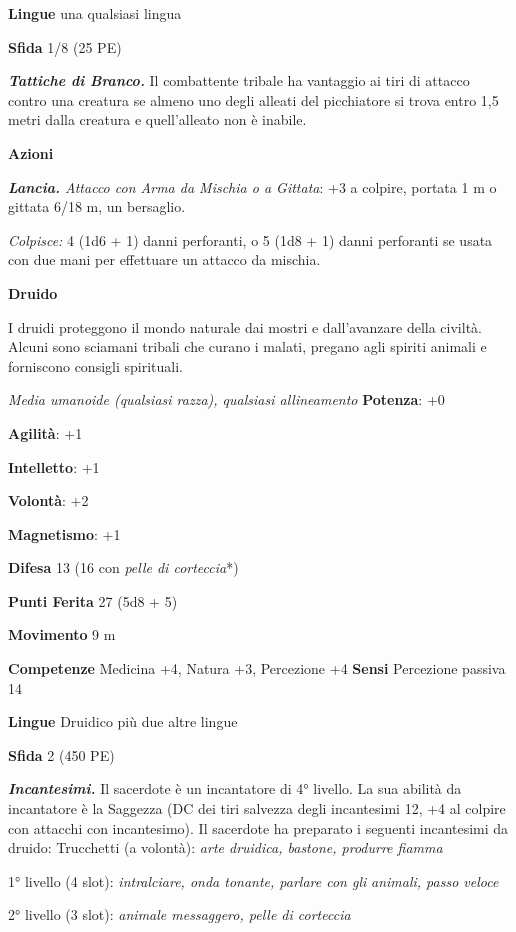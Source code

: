 \begin{multicols}{2}
\textbf{Lingue} una qualsiasi lingua

\textbf{Sfida} 1/8 (25 PE)\smallskip

\emph{\textbf{Tattiche di Branco.}} Il combattente tribale ha vantaggio
ai tiri di attacco contro una creatura se almeno uno degli alleati del
picchiatore si trova entro 1,5 metri dalla creatura e quell'alleato non
è inabile.

\smallskip\textbf{Azioni}

\emph{\textbf{Lancia.} Attacco con Arma da Mischia o a Gittata}: +3 a
colpire, portata 1 m o gittata 6/18 m, un bersaglio.

\emph{Colpisce:} 4 (1d6 + 1) danni perforanti, o 5 (1d8 + 1) danni
perforanti se usata con due mani per effettuare un attacco da mischia.

\textbf{Druido}

I druidi proteggono il mondo naturale dai mostri e dall'avanzare della
civiltà. Alcuni sono sciamani tribali che curano i malati, pregano agli
spiriti animali e forniscono consigli spirituali.

\emph{Media umanoide (qualsiasi razza), qualsiasi allineamento}
\textbf{Potenza}: +0

\textbf{Agilità}: +1

\textbf{Intelletto}: +1

\textbf{Volontà}: +2

\textbf{Magnetismo}: +1

\textbf{Difesa} 13 (16 con \emph{pelle di corteccia}*)

\textbf{Punti Ferita} 27 (5d8 + 5)

\textbf{Movimento} 9 m

\textbf{Competenze} Medicina +4, Natura +3, Percezione +4 \textbf{Sensi}
Percezione passiva 14

\textbf{Lingue} Druidico più due altre lingue

\textbf{Sfida} 2 (450 PE)\smallskip

\emph{\textbf{Incantesimi.}} Il sacerdote è un incantatore di 4°
livello. La sua abilità da incantatore è la Saggezza (DC dei tiri
salvezza degli incantesimi 12, +4 al colpire con attacchi con
incantesimo). Il sacerdote ha preparato i seguenti incantesimi da
druido: Trucchetti (a volontà): \emph{arte druidica, bastone, produrre
fiamma}

1° livello (4 slot): \emph{intralciare, onda tonante, parlare con gli}
\emph{animali, passo veloce}

2° livello (3 slot): \emph{animale messaggero, pelle di corteccia}


\end{multicols}
